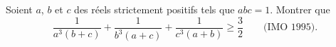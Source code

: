 Soient $a$, $b$ et $c$ des réels strictement positifs tels que $abc = 1$. Montrer que
\[ \frac{1}{a^3(b + c)} + \frac{1}{b^3(a + c)} + \frac{1}{c^3(a + b)} \geq \frac{3}{2} \qquad \text{(IMO 1995).} \]
